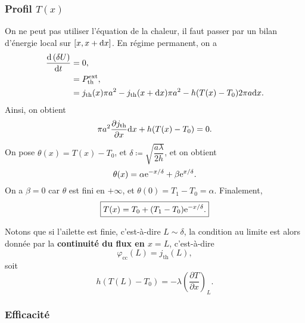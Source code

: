         \subsubsection{Profil $T(x)$}

            On ne peut pas utiliser l'équation de la chaleur, il faut passer par un bilan d'énergie local sur $[x,x+\mathrm{d} x]$. En régime permanent, on a 
            \begin{align}
                \frac{\mathrm{d}\left(\delta U\right)}{\mathrm{d} t}
                &=
                0,\\
                &=
                P_{\text{th}}^{\text{ext}},\\
                &=
                j_{\text{th}}(x)\pi a^{2}-j_{\text{th}}(x+\mathrm{d} x)\pi a^{2}-h(T(x)-T_0)2\pi a\mathrm{d} x.
            \end{align}
            Ainsi, on obtient
            \begin{equation}
                \pi a^{2}\frac{\partial j_{\text{th}}}{\partial x}\mathrm{d} x+h(T(x)-T_0)=0.
            \end{equation}
            On pose $\theta(x)=T(x)-T_0$, et $\delta\coloneqq\sqrt{\dfrac{a\lambda}{2h}}$, et on obtient 
            \begin{equation}
                \theta(x)=\alpha\mathrm{e}^{-x/\delta}+\beta\mathrm{e}^{x/\delta}.
            \end{equation}
            On a $\beta =0$ car $\theta$ est fini en $+\infty$, et $\theta(0)=T_1-T_0=\alpha$. Finalement,
            \begin{equation}
                \boxed{
                    T(x)=T_0+(T_1-T_0)\mathrm{e}^{-x/\delta}.
                }
            \end{equation}

            Notons que si l'ailette est \og finie\fg, c'est-à-dire $L\sim\delta$, la condition au limite est alors donnée par la \textbf{continuité du flux en $x=L$}, c'est-à-dire 
            \begin{equation}
                \varphi_{\text{cc}}(L)=j_{\text{th}}(L),
            \end{equation}
            soit
            \begin{equation}
                \boxed{
                    h(T(L)-T_0)=-\lambda\left(\frac{\partial T}{\partial x}\right)_{L}.
                }
            \end{equation}

        \subsubsection{Efficacité}


